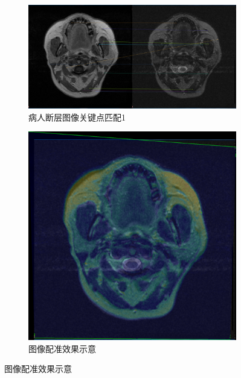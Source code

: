 \documentclass[a4paper, utf8]{ctexart}
\begin{document}
	\begin{figure}[htbp]
		\centering
		\begin{subfigure}{.6\textwidth}
			\centering
			\includegraphics[height=.13\textheight]{./figure/match_opencv_1.png}
			\caption{病人断层图像关键点匹配1}
		\end{subfigure}
		\begin{subfigure}{.3\textwidth}
			\centering
			\includegraphics[height=.13\textheight]{./figure/compare_opencv_1.png}
			\caption{图像配准效果示意}
		\end{subfigure}
		

\end{figure}
\end{document}
